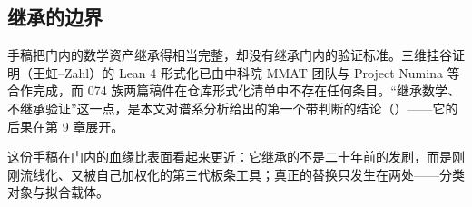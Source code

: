 \subsection{继承的边界}

\begin{cautbox}[未继承的东西]
手稿把门内的数学资产继承得相当完整，却没有继承门内的验证标准。三维挂谷证明（王虹--Zahl）的 Lean 4 形式化已由中科院 MMAT 团队与 Project Numina 等合作完成，而 074 族两篇稿件在仓库形式化清单中不存在任何条目。“继承数学、不继承验证”这一点，是本文对谱系分析给出的第一个带判断的结论（\cfH）——它的后果在第 9 章展开。
\end{cautbox}

\begin{keybox}[可记忆主句]
这份手稿在门内的血缘比表面看起来更近：它继承的不是二十年前的发刷，而是刚刚流线化、又被自己加权化的第三代板条工具；真正的替换只发生在两处——分类对象与拟合载体。
\end{keybox}